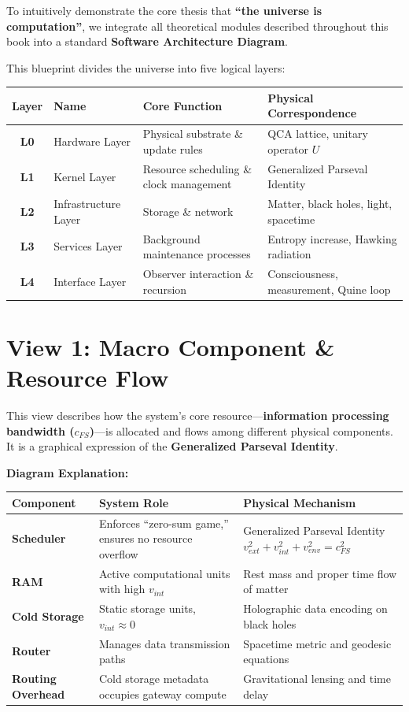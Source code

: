 \documentclass[11pt,a4paper,twoside]{book}
\begin{document}
To intuitively demonstrate the core thesis that \textbf{``the universe is computation''}, we integrate all theoretical modules described throughout this book into a standard \textbf{Software Architecture Diagram}.

This blueprint divides the universe into five logical layers:

\begin{table}[h]
\centering
\begin{tabular}{|c|l|l|l|}
\hline
\textbf{Layer} & \textbf{Name} & \textbf{Core Function} & \textbf{Physical Correspondence} \\
\hline
\textbf{L0} & Hardware Layer & Physical substrate \& update rules & QCA lattice, unitary operator $U$ \\
\hline
\textbf{L1} & Kernel Layer & Resource scheduling \& clock management & Generalized Parseval Identity \\
\hline
\textbf{L2} & Infrastructure Layer & Storage \& network & Matter, black holes, light, spacetime \\
\hline
\textbf{L3} & Services Layer & Background maintenance processes & Entropy increase, Hawking radiation \\
\hline
\textbf{L4} & Interface Layer & Observer interaction \& recursion & Consciousness, measurement, Quine loop \\
\hline
\end{tabular}
\end{table}

\section{View 1: Macro Component \& Resource Flow}

This view describes how the system's core resource---\textbf{information processing bandwidth ($c_{FS}$)}---is allocated and flows among different physical components. It is a graphical expression of the \textbf{Generalized Parseval Identity}.

\textbf{Diagram Explanation:}

\begin{table}[h]
\centering
\begin{tabular}{|l|l|l|}
\hline
\textbf{Component} & \textbf{System Role} & \textbf{Physical Mechanism} \\
\hline
\textbf{Scheduler} & Enforces ``zero-sum game,'' ensures no resource overflow & Generalized Parseval Identity $v_{ext}^2 + v_{int}^2 + v_{env}^2 = c_{FS}^2$ \\
\hline
\textbf{RAM} & Active computational units with high $v_{int}$ & Rest mass and proper time flow of matter \\
\hline
\textbf{Cold Storage} & Static storage units, $v_{int} \approx 0$ & Holographic data encoding on black holes \\
\hline
\textbf{Router} & Manages data transmission paths & Spacetime metric and geodesic equations \\
\hline
\textbf{Routing Overhead} & Cold storage metadata occupies gateway compute & Gravitational lensing and time delay \\
\hline
\end{tabular}
\end{table}
\end{document}
